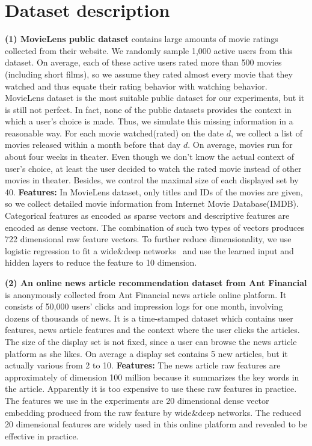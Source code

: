 \documentclass{article} %
\begin{document}
\section{Dataset description}\label{app:dataset}
{\bf (1) MovieLens public dataset} contains large amounts of movie ratings collected from their website. We randomly sample 1,000 active users from this dataset. On average, each of these active users rated more than 500 movies (including short films), so we assume they rated almost every movie that they watched and thus equate their rating behavior with watching behavior. MovieLens dataset is the most suitable public dataset for our experiments, but it is still not perfect. In fact, none of the public datasets provides the context in which a user's choice is made. Thus, we simulate this missing information in a reasonable way. For each movie watched(rated) on the date $d$, we collect a list of movies released within a month before that day $d$. On average, movies run for about four weeks in theater. Even though we don't know the actual context of user's choice, at least the user decided to watch the rated movie instead of other movies in theater. Besides, we control the maximal size of each displayed set by 40. {\bf Features:} In MovieLens dataset, only titles and IDs of the movies are given, so we collect detailed movie information from Internet Movie Database(IMDB). Categorical features as encoded as sparse vectors and descriptive features are encoded as dense vectors. The combination of such two types of vectors produces 722 dimensional raw feature vectors. To further reduce dimensionality, we use logistic regression to fit a wide\&deep networks~\citep{ChengKocHarmsen16} and use the learned input and hidden layers to reduce the feature to 10 dimension.

{\bf (2) An online news article recommendation dataset from Ant Financial} is anonymously collected from Ant Financial news article online platform. It consists of 50,000 users' clicks and impression logs for one month, involving dozens of thousands of news. It is a time-stamped dataset which contains user features, news article features and the context where the user clicks the articles. The size of the display set is not fixed, since a user can browse the news article platform as she likes. On average a display set contains 5 new articles, but it actually various from 2 to 10.  {\bf Features:} The news article raw features are approximately of dimension 100 million because it summarizes the key words in the article. Apparently it is too expensive to use these raw features in practice. The features we use in the experiments are 20 dimensional dense vector embedding produced from the raw feature by wide\&deep networks. 
The reduced 20 dimensional features are widely used in this online platform and revealed to be effective in practice.
\end{document}

